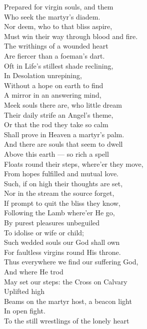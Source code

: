  Prepared for virgin souls, and them \\
 Who seek the martyr’s diadem. \\
  Nor deem, who to that bliss aspire, \\
 Must win their way through blood and fire. \\
 The writhings of a wounded heart \\
 Are fiercer than a foeman’s dart. \\
 Oft in Life’s stillest shade reclining, \\
 In Desolation unrepining, \\
 Without a hope on earth to find \\
 A mirror in an answering mind, \\
 Meek souls there are, who little dream \\
 Their daily strife an Angel’s theme, \\
 Or that the rod they take so calm \\
 Shall prove in Heaven a martyr’s palm. \\
  And there are souls that seem to dwell \\
 Above this earth — so rich a spell \\
 Floats round their steps, where’er they move, \\
 From hopes fulfilled and mutual love. \\
 Such, if on high their thoughts are set, \\
 Nor in the stream the source forget, \\
 If prompt to quit the bliss they know, \\
 Following the Lamb where’er He go, \\
 By purest pleasures unbeguiled \\
 To idolise or wife or child; \\
 Such wedded souls our God shall own \\
 For faultless virgins round His throne. \\
  Thus everywhere we find our suffering God, \\
 And where He trod \\
 May set our steps: the Cross on Calvary \\
 Uplifted high \\
 Beams on the martyr host, a beacon light \\
 In open fight. \\
  To the still wrestlings of the lonely heart \\
